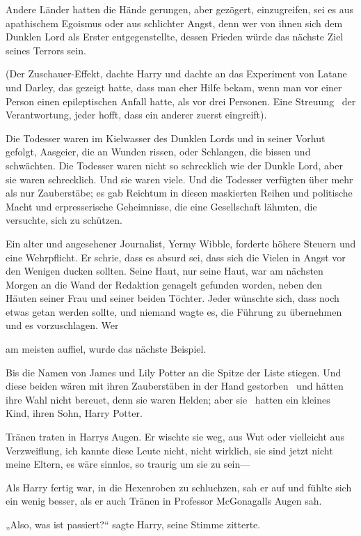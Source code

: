 {Andere Länder hatten die Hände gerungen, aber gezögert, einzugreifen, sei es aus apathischem Egoismus oder aus schlichter Angst, denn wer von ihnen sich dem Dunklen Lord als Erster entgegenstellte, dessen Frieden würde das nächste Ziel seines Terrors sein.

(Der Zuschauer-Effekt, dachte Harry und dachte an das Experiment von Latane und Darley, das gezeigt hatte, dass man eher Hilfe bekam, wenn man vor einer Person einen epileptischen Anfall hatte, als vor drei Personen. Eine Streuung ~der Verantwortung, jeder hofft, dass ein anderer zuerst eingreift).

Die Todesser waren im Kielwasser des Dunklen Lords und in seiner Vorhut gefolgt, Aasgeier, die an Wunden rissen, oder Schlangen, die bissen und schwächten. Die Todesser waren nicht so schrecklich wie der Dunkle Lord, aber sie waren schrecklich. Und sie waren viele. Und die Todesser verfügten über mehr als nur Zauberstäbe; es gab Reichtum in diesen maskierten Reihen und politische Macht und erpresserische Geheimnisse, die eine Gesellschaft lähmten, die versuchte, sich zu schützen.

Ein alter und angesehener Journalist, Yermy Wibble, forderte höhere Steuern und eine Wehrpflicht. Er schrie, dass es absurd sei, dass sich die Vielen in Angst vor den Wenigen ducken sollten. Seine Haut, nur seine Haut, war am nächsten Morgen an die Wand der Redaktion genagelt gefunden worden, neben den Häuten seiner Frau und seiner beiden Töchter. Jeder wünschte sich, dass noch etwas getan werden sollte, und niemand wagte es, die Führung zu übernehmen und es vorzuschlagen. Wer

am meisten auffiel, wurde das nächste Beispiel.

Bis die Namen von James und Lily Potter an die Spitze der Liste stiegen. Und diese beiden wären mit ihren Zauberstäben in der Hand gestorben ~und hätten ihre Wahl nicht bereuet, denn sie waren Helden; aber sie ~hatten ein kleines Kind, ihren Sohn, Harry Potter.

Tränen traten in Harrys Augen. Er wischte sie weg, aus Wut oder vielleicht aus Verzweiflung, ich kannte diese Leute nicht, nicht wirklich, sie sind jetzt nicht meine Eltern, es wäre sinnlos, so traurig um sie zu sein—

Als Harry fertig war, in die Hexenroben zu schluchzen, sah er auf und fühlte sich ein wenig besser, als er auch Tränen in Professor McGonagalls Augen sah.

„Also, was ist passiert?“ sagte Harry, seine Stimme zitterte.

}
